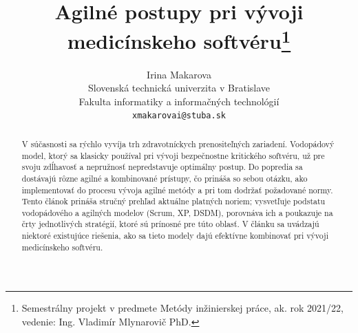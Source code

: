 \documentclass[10pt,twoside,slovak,a4paper]{article}
\title{Agilné postupy pri vývoji medicínskeho softvéru\thanks{Semestrálny projekt v predmete Metódy inžinierskej práce, ak. rok 2021/22, vedenie: Ing. Vladimír Mlynarovič PhD.}}
\author{Irina Makarova\\[2pt]
	{\small Slovenská technická univerzita v Bratislave}\\
	{\small Fakulta informatiky a informačných technológií}\\
	{\small \texttt{xmakarovai@stuba.sk}}
	}
\begin{document}
\maketitle

\begin{abstract}
V súčasnosti sa rýchlo vyvíja trh zdravotníckych prenositeľných zariadení. Vodopádový model, ktorý sa klasicky používal pri vývoji bezpečnostne kritického softvéru, už pre svoju zdĺhavosť a nepružnosť nepredstavuje optimálny postup. Do popredia sa dostávajú rôzne agilné a kombinované prístupy, čo prináša so sebou otázku, ako implementovať do procesu vývoja agilné metódy a pri tom dodržať požadované normy. Tento článok prináša stručný prehľad aktuálne platných noriem; vysvetľuje podstatu vodopádového a agilných modelov (Scrum, XP, DSDM), porovnáva ich a poukazuje na črty jednotlivých stratégií, ktoré sú prínosné pre túto oblasť. V článku sa uvádzajú niektoré existujúce riešenia, ako sa tieto modely dajú efektívne kombinovať pri vývoji medicínskeho softvéru.
\end{abstract}
\end{document}
